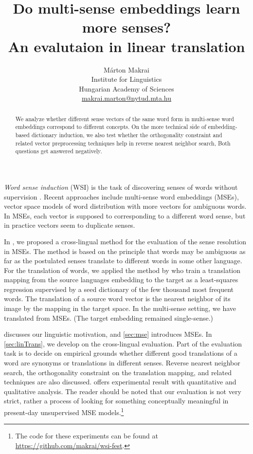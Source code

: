 \documentclass[11pt]{article}
\title{Do multi-sense embeddings learn more senses? \\ An evalutaion in linear
translation}
\author{
  Márton Makrai
  \\ Institute for Linguistics\\
  Hungarian Academy of Sciences \\
  \href{mailto:makrai.hlt@gmail.com}{makrai.marton@nytud.mta.hu} \\
}
\date{}
\begin{document}
\maketitle


\begin{abstract}
  We analyze whether different sense vectors of the same word form in
  multi-sense word embeddings correspond to different concepts. On the more
  technical side of embedding-based dictionary induction, we also test whether
  the orthogonality constraint and related vector preprocessing techniques help
  in reverse nearest neighbor search, Both questions get answered negatively.
\end{abstract}


\emph{Word sense induction} (WSI) is the task of discovering senses of words
without supervision \citep{Schutze:1998}. Recent approaches include multi-sense
word embeddings (MSEs), vector space models of word distribution with more
vectors for ambiguous words. In MSEs, each vector is supposed to corresponding
to a different word sense, but in practice vectors seem to duplicate senses.

In \cite{Borbely:2016}, we proposed a cross-lingual method for the evaluation
of the sense resolution in MSEs. The method is based on the principle that
words may be ambiguous as far as the postulated senses translate to different
words in some other language.  For the translation of words, we applied the
method by \citet{Mikolov:2013x} who train a translation mapping from the source
languages embedding to the target as a least-squares regression supervised by a
seed dictionary of the few thousand most frequent words. The translation of a
source word vector is the nearest neighbor of its image by the mapping in the
target space. In the multi-sense setting, we have translated from MSEs. (The
target embedding remained single-sense.)

 discusses our linguistic motivation, and \cref{sec:mse}
introduces MSEs.  In \cref{sec:linTrans}, we develop on the cross-lingual
evaluation. Part of the evaluation task is to decide on empirical grounds
whether different good translations of a word are synonyms or translations in
different senses.  Reverse nearest neighbor search, the orthogonality constraint
on the translation mapping, and related techniques are also discussed.
 offers experimental result with quantitative and qualitative
analysis.  The reader should be noted that our evaluation is not very strict,
rather a process of looking for something conceptually meaningful in
present-day unsupervised MSE models.\footnote{The code for these experiments
can be found at \url{https://github.com/makrai/wsi-fest}.}
\end{document}
